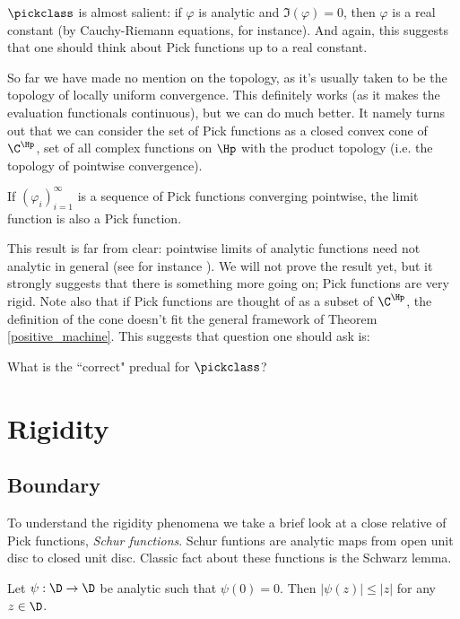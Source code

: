 $\pickclass$ is almost salient: if $\varphi$ is analytic and $\Im(\varphi) = 0$, then $\varphi$ is a real constant (by Cauchy-Riemann equations, for instance). And again, this suggests that one should think about Pick functions up to a real constant.

So far we have made no mention on the topology, as it's usually taken to be the topology of locally uniform convergence. This definitely works (as it makes the evaluation functionals continuous), but we can do much better. It namely turns out that we can consider the set of Pick functions as a closed convex cone of $\C^{\Hp}$, set of all complex functions on $\Hp$ with the product topology (i.e. the topology of pointwise convergence).

\begin{prop}\label{pick_convergence}
	If $(\varphi_{i})_{i = 1}^{\infty}$ is a sequence of Pick functions converging pointwise, the limit function is also a Pick function.
\end{prop}

This result is far from clear: pointwise limits of analytic functions need not analytic in general (see for instance \cite{Mittag}). We will not prove the result yet, but it strongly suggests that there is something more going on; Pick functions are very rigid. Note also that if Pick functions are thought of as a subset of $\C^{\Hp}$, the definition of the cone doesn't fit the general framework of Theorem \ref{positive_machine}. This suggests that question one should ask is:

\begin{quest}\label{pick_predual}
	What is the ``correct" predual for $\pickclass$?
\end{quest}


\section{Rigidity}

\subsection{Boundary}

To understand the rigidity phenomena we take a brief look at a close relative of Pick functions, \textit{Schur functions}. Schur funtions are analytic maps from open unit disc to closed unit disc. Classic fact about these functions is the Schwarz lemma.

\begin{lause}
	Let $\psi : \D \to \D$ be analytic such that $\psi(0) = 0$. Then $|\psi(z)| \leq |z|$ for any $z \in \D$.
\end{lause}


